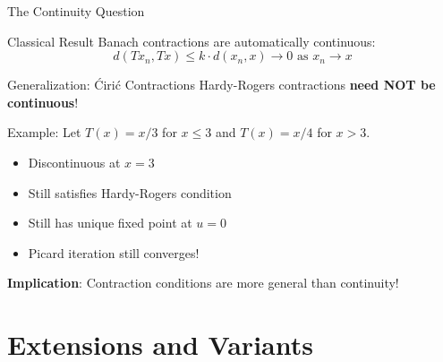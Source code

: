 \documentclass[aspectratio=169,10pt]{beamer}
\begin{document}
\begin{frame}{The Continuity Question}
    \begin{block}{Classical Result}
        Banach contractions are automatically continuous:
        \begin{equation*}
            d(Tx_n, Tx) \leq k \cdot d(x_n, x) \to 0 \text{ as } x_n \to x
        \end{equation*}
    \end{block}

    \vspace{0.4cm}
    \begin{block}{Generalization: Ćirić Contractions}
        Hardy-Rogers contractions \textbf{need NOT be continuous}!

        Example: Let $T(x) = x/3$ for $x \leq 3$ and $T(x) = x/4$ for $x > 3$.
        \begin{itemize}
            \item Discontinuous at $x = 3$
            \item Still satisfies Hardy-Rogers condition
            \item Still has unique fixed point at $u = 0$
            \item Picard iteration still converges!
        \end{itemize}
    \end{block}

    \vspace{0.3cm}
    \textbf{Implication}: Contraction conditions are more general than continuity!
\end{frame}

\section{Extensions and Variants}
\end{document}
